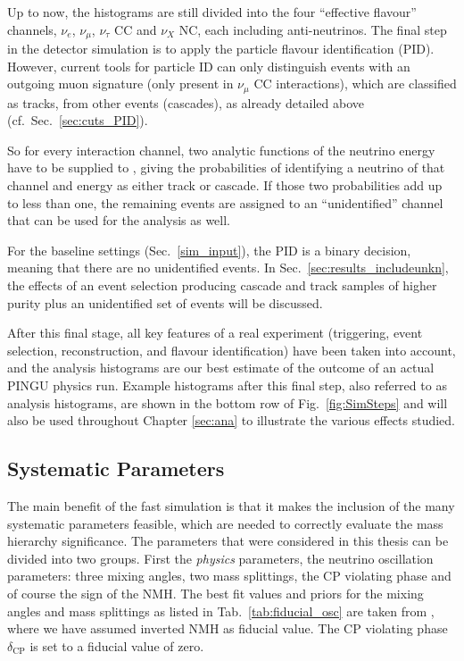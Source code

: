 Up to now, the histograms are still divided into the four ``effective flavour''
channels, $\nu_e$, $\nu_\mu$, $\nu_\tau$ CC and $\nu_X$ NC, each including
anti-neutrinos. The final step in the detector simulation is to apply the
particle flavour identification (PID). However, current tools for particle ID
can only distinguish events with an outgoing muon signature (only present in
$\nu_\mu$ CC interactions), which are classified as tracks, from other events
(cascades), as already detailed above (cf.\ Sec.~\ref{sec:cuts_PID}).

So for every interaction channel, two analytic functions of the neutrino
energy have to be supplied to \papa, giving the probabilities of identifying a
neutrino of that channel and energy as either track or cascade. If those two
probabilities add up to less than one, the remaining events are assigned to an
``unidentified'' channel that can be used for the analysis as well.

For the baseline settings (Sec.~\ref{sim_input}), the PID is a binary decision,
meaning that there are no unidentified events. In
Sec.~\ref{sec:results_includeunkn}, the effects of an event selection producing
cascade and track samples of higher purity plus an unidentified set of events
will be discussed.

After this final stage, all key features of a real experiment (triggering,
event selection, reconstruction, and flavour identification) have been taken
into account, and the analysis histograms are our best estimate of the outcome
of an actual PINGU physics run. Example histograms after this final step, also
referred to as analysis histograms, are shown in the bottom row of
Fig.~\ref{fig:SimSteps} and will also be used throughout Chapter \ref{sec:ana}
to illustrate the various effects studied.


\subsection{Systematic Parameters}
\label{sec:systematics}

The main benefit of the fast simulation is that it makes the inclusion of
the many systematic parameters feasible, which are needed to correctly evaluate
the mass hierarchy significance. The parameters that were considered in this
thesis can be divided into two groups. First the \emph{physics} parameters,
\ie the neutrino oscillation parameters: three mixing angles, two mass
splittings, the CP violating phase and of course the sign of the NMH. The best
fit values and priors for the mixing angles and mass splittings as listed in
Tab.~\ref{tab:fiducial_osc} are taken from \cite{Fogli}, where we have assumed
inverted NMH as fiducial value. The CP violating phase $\delta_\mathrm{CP}$ is
set to a fiducial value of zero.

